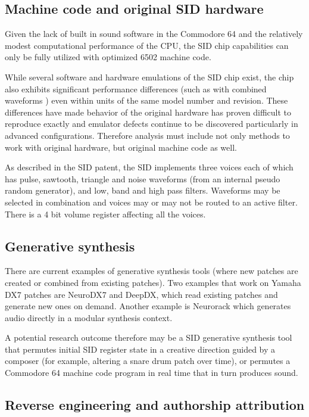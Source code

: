 \documentclass[10pt]{article}
\begin{document}
\begin{multicols*}{2}
\subsection{Machine code and original SID hardware}

Given the lack of built in sound software in the Commodore 64 and the relatively modest computational performance of the CPU, the SID chip capabilities can only be fully utilized with optimized 6502 machine code\cite{c64digi}.

While several software and hardware emulations of the SID chip exist, the chip also exhibits significant performance differences (such as with combined waveforms \cite{fixcombwaveforms}) even within units of the same model number and revision. These differences have made behavior of the original hardware has proven difficult to reproduce exactly and emulator defects continue to be discovered particularly in advanced configurations. Therefore analysis must include not only methods to work with original hardware, but original machine code as well.

As described in the SID patent\cite{sidpatent}, the SID implements three voices each of which has pulse, sawtooth, triangle and noise waveforms (from an internal pseudo random generator), and low, band and high pass filters. Waveforms may be selected in combination and voices may or may not be routed to an active filter. There is a 4 bit volume register affecting all the voices.

\subsection{Generative synthesis}

There are current examples of generative synthesis tools (where new patches are created or combined from existing patches). Two examples that work on Yamaha DX7 patches are NeuroDX7\cite{neurodx7} and DeepDX\cite{deepdx}, which read existing patches and generate new ones on demand. Another example is Neurorack\cite{neurorack} which generates audio directly in a modular synthesis context.

A potential research outcome therefore may be a SID generative synthesis tool that permutes initial SID register state in a creative direction guided by a composer (for example, altering a snare drum patch over time), or permutes a Commodore 64 machine code program in real time that in turn produces sound.

\subsection{Reverse engineering and authorship attribution}


\end{multicols*}
\end{document}
